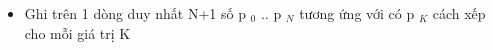 \begin{itemize}
	\item Ghi trên 1 dòng duy nhất N+1 số p $_ 0 $ .. p $_ N $ tương ứng với có p $_ K $ cách xếp cho mỗi giá trị K
\end{itemize}